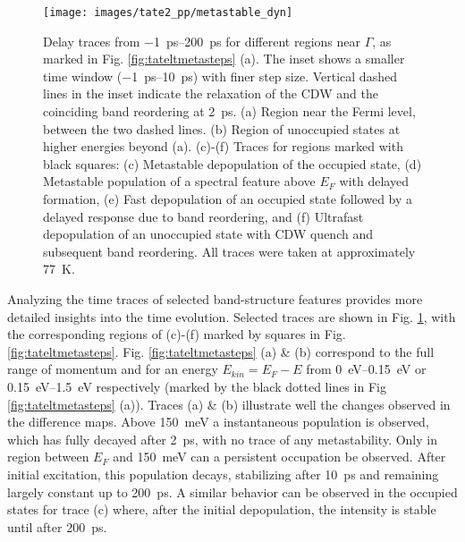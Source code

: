 \begin{figure}[t]
	\centering
	\texttt{[image: images/tate2\_pp/metastable\_dyn]}
	\caption{Delay traces from \qtyrange{-1}{200}{\pico\second} for different regions near $\Gamma$, as marked in Fig. \ref{fig:tateltmetasteps} (a). The inset shows a smaller time window (\qtyrange{-1}{10}{\pico\second}) with finer step size. Vertical dashed lines in the inset indicate the relaxation of the CDW and the coinciding band reordering at \qty{2}{\pico\second}. (a) Region near the Fermi level, between the two dashed lines. (b) Region of unoccupied states at higher energies beyond (a). (c)-(f) Traces for regions marked with black squares: (c) Metastable depopulation of the occupied state, (d) Metastable population of a spectral feature above $E_F$ with delayed formation, (e) Fast depopulation of an occupied state followed by a delayed response due to band reordering, and (f) Ultrafast depopulation of an unoccupied state with CDW quench and subsequent band reordering. All traces were taken at approximately \qty{77}{\kelvin}.}
	\label{fig:metastableedge}
\end{figure}


Analyzing the time traces of selected band-structure features provides more detailed insights into the time evolution.
Selected traces are shown in Fig. \ref{fig:metastableedge}, with the corresponding regions of (c)-(f) marked by squares in Fig. \ref{fig:tateltmetasteps}.
Fig. \ref{fig:tateltmetasteps} (a) \& (b) correspond to the full range of momentum and for an energy $E_{kin}=E_F-E$ from \qtyrange{0}{0.15}{\electronvolt} or \qtyrange{0.15}{1.5}{\electronvolt} respectively (marked by the black dotted lines in Fig \ref{fig:tateltmetasteps} (a)).
Traces (a) \& (b) illustrate well the changes observed in the difference maps.
Above \qty{150}{\milli\electronvolt} a instantaneous population is observed, which has fully decayed after \qty{2}{\pico\second}, with no trace of any metastability.
Only in region between $E_F$ and \qty{150}{\milli\electronvolt} can a persistent occupation be observed.
After initial excitation, this population decays, stabilizing after \qty{10}{\pico\second} and remaining largely constant up to \qty{200}{\pico\second}.
A similar behavior can be observed in the occupied states for trace (c) where, after the initial depopulation, the intensity is stable until after \qty{200}{\pico\second}.

